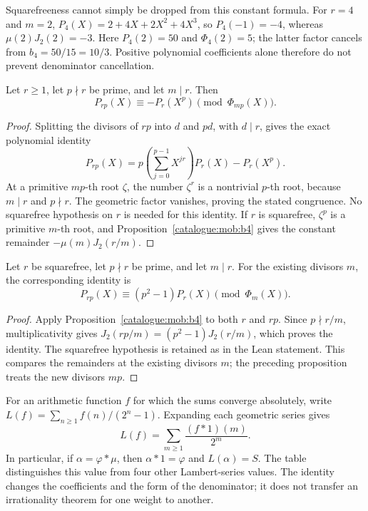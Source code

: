 Squarefreeness cannot simply be dropped from this constant formula.
For $r=4$ and $m=2$,
$P_4(X)=2+4X+2X^2+4X^3$, so $P_4(-1)=-4$, whereas
$\mu(2)J_2(2)=-3$. Here $P_4(2)=50$ and $\Phi_4(2)=5$;
the latter factor cancels from $b_4=50/15=10/3$. Positive polynomial
coefficients alone therefore do not prevent denominator cancellation.


\begin{prop}\label{catalogue:mob:b8a}
Let $r\ge1$, let $p\nmid r$ be prime, and let $m\mid r$. Then
\[
 P_{rp}(X)\equiv-P_r(X^p)\pmod{\Phi_{mp}(X)}.
\]
\end{prop}

\begin{proof}
Splitting the divisors of $rp$ into $d$ and $pd$, with $d\mid r$,
gives the exact polynomial identity
\[
 P_{rp}(X)=p\left(\sum_{j=0}^{p-1}X^{jr}\right)P_r(X)-P_r(X^p).
\]
At a primitive $mp$-th root $\zeta$, the number $\zeta^r$ is a
nontrivial $p$-th root, because $m\mid r$ and $p\nmid r$.
The geometric factor vanishes, proving the stated congruence.
No squarefree hypothesis on $r$ is needed for this identity.
If $r$ is squarefree, $\zeta^p$ is a primitive $m$-th root, and
Proposition~\ref{catalogue:mob:b4} gives the constant remainder
$-\mu(m)J_2(r/m)$.
\end{proof}


\begin{prop}\label{catalogue:mob:b8b}
Let $r$ be squarefree, let $p\nmid r$ be prime, and let $m\mid r$.
For the existing divisors $m$, the corresponding identity is
\[
 P_{rp}(X)\equiv(p^2-1)P_r(X)\pmod{\Phi_m(X)}.
\]
\end{prop}

\begin{proof}
Apply Proposition~\ref{catalogue:mob:b4} to both $r$ and $rp$.
Since $p\nmid r/m$, multiplicativity gives
$J_2(rp/m)=(p^2-1)J_2(r/m)$, which proves the identity.
The squarefree hypothesis is retained as in the Lean statement.
This compares the remainders at the existing divisors $m$; the
preceding proposition treats the new divisors $mp$.
\end{proof}


\begin{prop}\label{catalogue:cert:d7}
For an arithmetic function $f$ for which the sums converge absolutely,
write $L(f)=\sum_{n\ge1}f(n)/(2^n-1)$. Expanding each geometric series gives
\[
 L(f)=\sum_{m\ge1}\frac{(f*1)(m)}{2^m}.
\]
In particular, if $\alpha=\varphi*\mu$, then $\alpha*1=\varphi$ and
$L(\alpha)=S$. The table distinguishes this value from four other
Lambert-series values. The identity changes the coefficients and the
form of the denominator; it does not transfer an irrationality theorem
for one weight to another.
\end{prop}

